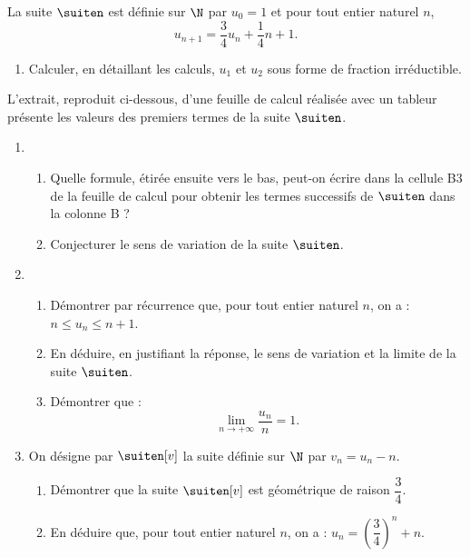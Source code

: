 La suite $\suiten$ est définie sur $\N$ par $u_0=1$ et pour tout entier naturel $n$, $$u_{n+1}=  \dfrac34 u_n+\dfrac14 n+1.$$

\begin{enumerate}
	\item Calculer, en détaillant les calculs, $u_1$ et $u_2$ sous forme de fraction irréductible.
\end{enumerate}

L’extrait, reproduit ci-dessous, d’une feuille de calcul réalisée avec un tableur présente les valeurs des premiers termes de la suite $\suiten$.

\begin{center}
\end{center}

\begin{enumerate}[resume]
	\item 
	\begin{enumerate}
		\item Quelle formule, étirée ensuite vers le bas, peut-on écrire dans la cellule {\helvbx B3} de la feuille de calcul pour obtenir les termes successifs de $\suiten$ dans la colonne {\helvbx B} ?
		\item Conjecturer le sens de variation de la suite $\suiten$.
	\end{enumerate}
	\item 
	\begin{enumerate}
		\item  Démontrer par récurrence que, pour tout entier naturel $n$, on a : $n \leqslant u_n \leqslant n+1$.
		\item En déduire, en justifiant la réponse, le sens de variation et la limite de la suite $\suiten$.
		\item Démontrer que : \[\lim_{n \to +\infty} \dfrac{u_n}{n} = 1.\]
	\end{enumerate}
	\item On désigne par $\suiten[v]$ la suite définie sur $\N$ par $v_n= u_n-n$.
	\begin{enumerate}
		\item Démontrer que la suite $\suiten[v]$ est géométrique de raison $\dfrac34$.
		\item En déduire que, pour tout entier naturel $n$, on a : $u_n=\left(\dfrac34\right)^n+n$.
	\end{enumerate}
\end{enumerate}

